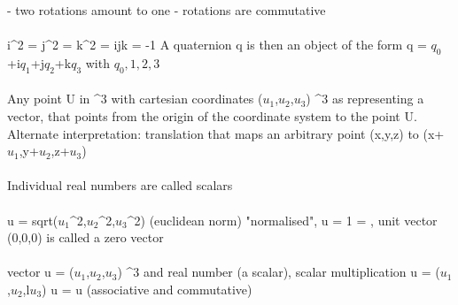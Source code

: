 \documentclass{article}
\begin{document}
- two rotations amount to one
- rotations are commutative
\\
\\
\math i^2 = j^2 = k^2 = ijk = -1 \)
\newline A quaternion q is then an object of the form \math q = $q_0$+i$q_1$+j$q_2$+k$q_3$\) with \math $q_0,1,2,3$ \in \Re\)
\\
\\
Any point U in \Re^3\) with cartesian coordinates \math ($u_1$,$u_2$,$u_3$) \in \Re^3\) as representing a vector, that points from the origin of the coordinate system to the point U.
\newline Alternate interpretation: translation that maps an arbitrary point \math (x,y,z)\) to \math (x+$u_1$,y+$u_2$,z+$u_3$)\)
\\
\\
Individual real numbers \alpha \in \Re\) are called scalars
\\
\\
\vert u \vert = sqrt($u_1$^2,$u_2$^2,$u_3$^2)\) (euclidean norm)
\newline "normalised", \vert u \vert = 1 = \), unit vector
\newline \math(0,0,0)\) is called a zero vector
\\
\\
vector \math u = ($u_1$,$u_2$,$u_3$) \in \Re^3\) and real number \lambda\) (a scalar), scalar multiplication
\newline \math \lambda u = (\lambda$u_1$,\lambda$u_2$,l\ambda$u_3$)
\newline \therefore \vert \lambda u \vert = \vert \lambda \vert \vert u \vert\) (associative and commutative)
\end{document}
